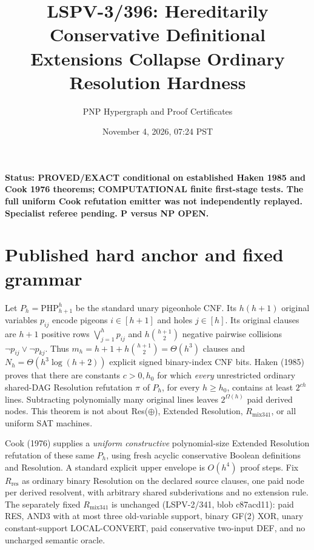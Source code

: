 \documentclass[11pt]{article}
\title{LSPV-3/396: Hereditarily Conservative Definitional Extensions Collapse Ordinary Resolution Hardness}
\author{PNP Hypergraph and Proof Certificates}
\date{November 4, 2026, 07:24 PST}
\begin{document}
\maketitle
\noindent\textbf{Status: PROVED/EXACT conditional on established Haken 1985 and Cook 1976 theorems; COMPUTATIONAL finite first-stage tests. The full uniform Cook refutation emitter was not independently replayed. Specialist referee pending. P versus NP OPEN.}

\section*{Published hard anchor and fixed grammar}
Let $P_h=\mathrm{PHP}_{h+1}^{h}$ be the standard unary pigeonhole CNF. Its $h(h+1)$ original variables $p_{ij}$ encode pigeons $i\in[h+1]$ and holes $j\in[h]$. Its original clauses are $h+1$ positive rows $\bigvee_{j=1}^h p_{ij}$ and $h\binom{h+1}{2}$ negative pairwise collisions $\neg p_{ij}\lor\neg p_{kj}$. Thus $m_h=h+1+h\binom{h+1}{2}=\Theta(h^3)$ clauses and $N_h=\Theta(h^3\log(h+2))$ explicit signed binary-index CNF bits. Haken (1985) proves that there are constants $c>0,h_0$ for which \emph{every} unrestricted ordinary shared-DAG Resolution refutation $\pi$ of $P_h$, for every $h\ge h_0$, contains at least $2^{ch}$ lines. Subtracting polynomially many original lines leaves $2^{\Omega(h)}$ paid derived nodes. This theorem is not about Res($\oplus$), Extended Resolution, $R_{\mathrm{mix341}}$, or all uniform SAT machines.

Cook (1976) supplies a \emph{uniform constructive} polynomial-size Extended Resolution refutation of these same $P_h$, using fresh acyclic conservative Boolean definitions and Resolution. A standard explicit upper envelope is $O(h^4)$ proof steps. Fix $R_{\mathrm{res}}$ as ordinary binary Resolution on the declared source clauses, one paid node per derived resolvent, with arbitrary shared subderivations and no extension rule. The separately fixed $R_{\mathrm{mix341}}$ is unchanged (LSPV-2/341, blob c87acd11): paid RES, AND3 with at most three old-variable support, binary GF(2) XOR, unary constant-support LOCAL-CONVERT, paid conservative two-input DEF, and no uncharged semantic oracle.
\end{document}
